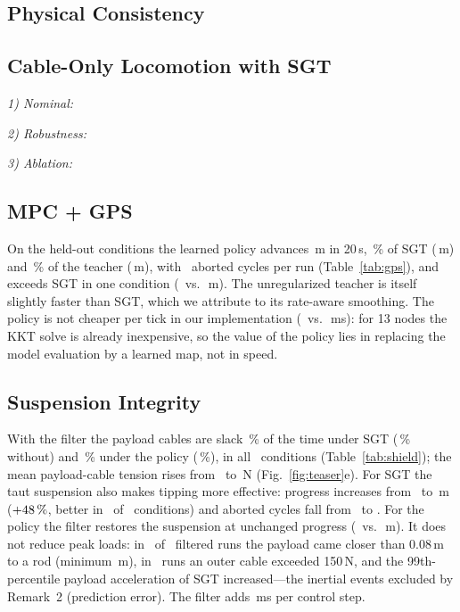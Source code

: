 \documentclass[letterpaper,10pt,conference]{IEEEtran}
\begin{document}
\subsection{Physical Consistency}




\subsection{Cable-Only Locomotion with SGT}
\emph{1) Nominal:} 

\emph{2) Robustness:} 

\emph{3) Ablation:} 




\subsection{MPC + GPS}

On the held-out conditions the learned policy advances
\gpsPolicyProgress\,m in 20\,s, \gpsRatio\,\% of SGT
(\gpsSgtProgress\,m) and \gpsTeacherRatio\,\% of the teacher
(\gpsTeacherProgress\,m), with \gpsPolicyAborts\ aborted cycles per run
(Table~\ref{tab:gps}), and exceeds SGT in one condition
(\gpsBestPolicy\ vs.\ \gpsBestSgt\,m). The unregularized teacher is
itself slightly faster than SGT, which we attribute to its rate-aware
smoothing. The policy is not cheaper per tick in our implementation
(\gpsPolicyMs\ vs.\ \gpsSgtMs\,ms): for 13 nodes the KKT solve is
already inexpensive, so the value of the policy lies in replacing the
model evaluation by a learned map, not in speed.

\subsection{Suspension Integrity}\label{sec:res-shield}

With the filter the payload cables are slack \shSlackOnSgt\,\% of the
time under SGT (\shSlackOffSgt\,\% without) and \shSlackOnGps\,\% under
the policy (\shSlackOffGps\,\%), in all \shConditions\ conditions
(Table~\ref{tab:shield}); the mean payload-cable tension rises from
\shTensionOffSgt\ to \shTensionOnSgt\,N (Fig.~\ref{fig:teaser}e). For
SGT the taut suspension also makes tipping more effective: progress
increases from \shProgOffSgt\ to \shProgOnSgt\,m ($+48\,\%$,
better in \shProgBetterSgt\ of \shConditions\ conditions) and aborted
cycles fall from \shAbortOffSgt\ to \shAbortOnSgt. For the policy the
filter restores the suspension at unchanged progress (\shProgOffGps\ vs.\
\shProgOnGps\,m). It does not reduce peak loads: in \shClearViol\ of
\shFilteredRuns\ filtered runs the payload came closer than 0.08\,m to
a rod (minimum \shClearMin\,m), in \shOuterViol\ runs an outer cable
exceeded 150\,N, and the 99th-percentile payload acceleration of SGT
increased---the inertial events excluded by Remark~2 (prediction error). The filter adds
\shMs\,ms per control step.
\end{document}
